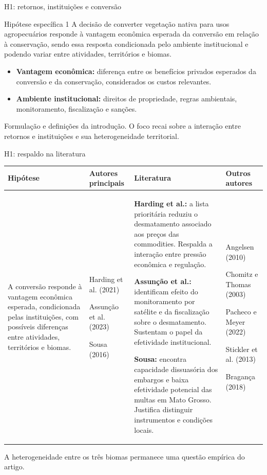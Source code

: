 \documentclass[aspectratio=169,11pt]{beamer}
\newcommand{\fonte}[1]{\par\vfill{\fontsize{7.5}{9}\selectfont\color{gray}#1\par}}
\newcommand{\tpar}{\par\vspace{1.5mm}}
\begin{document}
\begin{frame}{H1: retornos, instituições e conversão}
\begin{block}{Hipótese específica 1}
A decisão de converter vegetação nativa para usos agropecuários responde à vantagem econômica esperada da conversão em relação à conservação, sendo essa resposta condicionada pelo ambiente institucional e podendo variar entre atividades, territórios e biomas.
\end{block}
\medskip
\begin{itemize}
\item \textbf{Vantagem econômica:} diferença entre os benefícios privados esperados da conversão e da conservação, considerados os custos relevantes.
\medskip
\item \textbf{Ambiente institucional:} direitos de propriedade, regras ambientais, monitoramento, fiscalização e sanções.
\end{itemize}
\fonte{Formulação e definições da introdução. O foco recai sobre a interação entre retornos e instituições e sua heterogeneidade territorial.}
\end{frame}

\begin{frame}{H1: respaldo na literatura}
\fontsize{8.5}{10.6}\selectfont
\setlength{\tabcolsep}{4pt}
\begin{tabularx}{\textwidth}{P{2.6cm} P{2.25cm} X P{2.25cm}}
\toprule
\textbf{Hipótese} & \textbf{Autores principais} & \textbf{Literatura} & \textbf{Outros autores} \\
\midrule
A conversão responde à vantagem econômica esperada, condicionada pelas instituições, com possíveis diferenças entre atividades, territórios e biomas.
& Harding et al. (2021)\tpar Assunção et al. (2023)\tpar Sousa (2016)
& \textbf{Harding et al.:} a lista prioritária reduziu o desmatamento associado aos preços das commodities. Respalda a interação entre pressão econômica e regulação.\tpar
\textbf{Assunção et al.:} identificam efeito do monitoramento por satélite e da fiscalização sobre o desmatamento. Sustentam o papel da efetividade institucional.\tpar
\textbf{Sousa:} encontra capacidade dissuasória dos embargos e baixa efetividade potencial das multas em Mato Grosso. Justifica distinguir instrumentos e condições locais.
& Angelsen (2010)\tpar Chomitz e Thomas (2003)\tpar Pacheco e Meyer (2022)\tpar Stickler et al. (2013)\tpar Bragança (2018) \\
\bottomrule
\end{tabularx}
\fonte{A heterogeneidade entre os três biomas permanece uma questão empírica do artigo.}
\end{frame}
\end{document}
